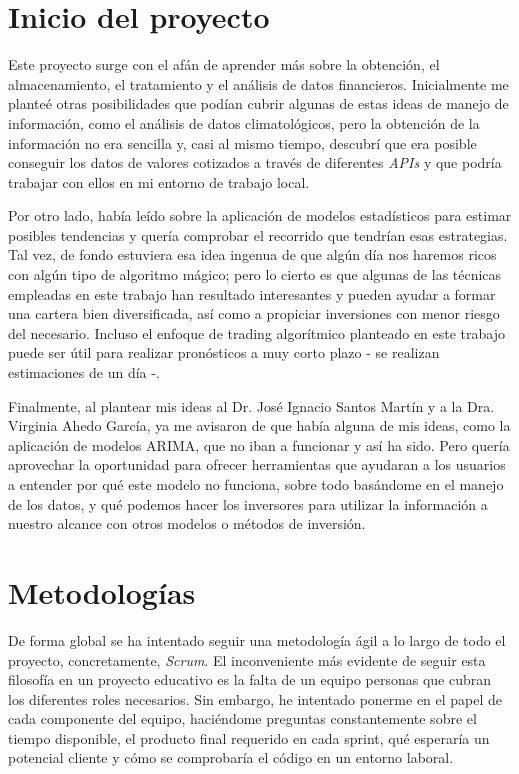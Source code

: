 
\section{Inicio del proyecto}\label{inicio-del-proyecto}

Este proyecto surge con el afán de aprender más sobre la obtención, el almacenamiento, el tratamiento y el análisis de datos financieros. Inicialmente me planteé otras posibilidades que podían cubrir algunas de estas ideas de manejo de información, como el análisis de datos climatológicos, pero la obtención de la información no era sencilla y, casi al mismo tiempo, descubrí que era posible conseguir los datos de valores cotizados a través de diferentes \emph{APIs}\citep{wiki:api} y que podría trabajar con ellos en mi entorno de trabajo local.   

Por otro lado, había leído sobre la aplicación de modelos estadísticos para estimar posibles tendencias y quería comprobar el recorrido que tendrían esas estrategias. Tal vez, de fondo estuviera esa idea ingenua de que algún día nos haremos ricos con algún tipo de algoritmo mágico; pero lo cierto es que algunas de las técnicas empleadas en este trabajo han resultado interesantes y pueden ayudar a formar una cartera bien diversificada, así como a propiciar inversiones con menor riesgo del necesario. Incluso el enfoque de trading algorítmico planteado en este trabajo puede ser útil para realizar pronósticos a muy corto plazo - se realizan estimaciones de un día -.

Finalmente, al plantear mis ideas al Dr. José Ignacio Santos Martín y a la Dra. Virginia Ahedo García, ya me avisaron de que había alguna de mis ideas, como la aplicación de modelos ARIMA, que no iban a funcionar y así ha sido. Pero quería aprovechar la oportunidad para ofrecer herramientas que ayudaran a los usuarios a entender por qué este modelo no funciona, sobre todo basándome en el manejo de los datos, y qué podemos hacer los inversores para utilizar la información a nuestro alcance con otros modelos o métodos de inversión. 

\section{Metodologías}\label{inicio-del-proyecto}

De forma global se ha intentado seguir una metodología ágil a lo largo de todo el proyecto, concretamente, \emph{Scrum}. El inconveniente más evidente de seguir esta filosofía en un proyecto educativo es la falta de un equipo personas que cubran los diferentes roles necesarios. Sin embargo, he intentado ponerme en el papel de cada componente del equipo, haciéndome preguntas constantemente sobre el tiempo disponible, el producto final requerido en cada sprint, qué esperaría un potencial cliente y cómo se comprobaría el código en un entorno laboral. 

